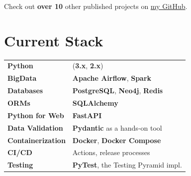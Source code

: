 \documentclass[a4paper,11pt]{article}
\newcommand{\MySkip}{
\vskip10pt
}
\begin{document}
\begin{adjustbox}{valign=t}
\begin{minipage}{0.65\textwidth}
\begin{flushleft}
\MySkip

Check out \textbf{over 10} other published projects on \href{https://github.com/realkarych}{my GitHub}. \\
\end{flushleft}

\section*{Current Stack}
\begin{tabular}{@{}p{5cm}p{9cm}@{}}
    \textbf{Python}                      & (\textbf{3.x}, \textbf{2.x}) \\
    \textbf{BigData}                     & \textbf{Apache Airflow}, \textbf{Spark} \\
    \textbf{Databases}                   & \textbf{PostgreSQL}, \textbf{Neo4j}, \textbf{Redis} \\
    \textbf{ORMs}                        & \textbf{SQLAlchemy} \\
    \textbf{Python for Web}              & \textbf{FastAPI} \\
    \textbf{Data Validation}             & \textbf{Pydantic} as a hands-on tool \\
    \textbf{Containerization}            & \textbf{Docker}, \textbf{Docker Compose} \\
    \textbf{CI/CD}                       & Actions, release processes \\
    \textbf{Testing}                     & \textbf{PyTest}, the Testing Pyramid impl. \\
\end{tabular}
\end{minipage}
\end{adjustbox}
\end{document}
